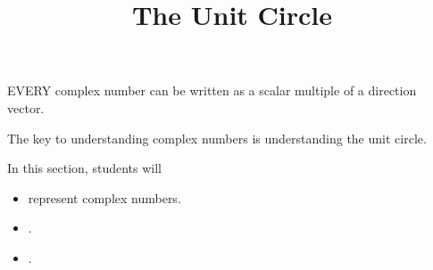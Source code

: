 \documentclass{ximera}
\title{The Unit Circle}
\begin{document}
\begin{abstract}
\end{abstract}
\maketitle


EVERY complex number can be written as a scalar multiple of a direction vector.


The key to understanding complex numbers is understanding the unit circle.




\begin{sectionOutcomes}
In this section, students will 

\begin{itemize}
\item represent complex numbers.
\item .
\item .
\end{itemize}
\end{sectionOutcomes}
\end{document}
